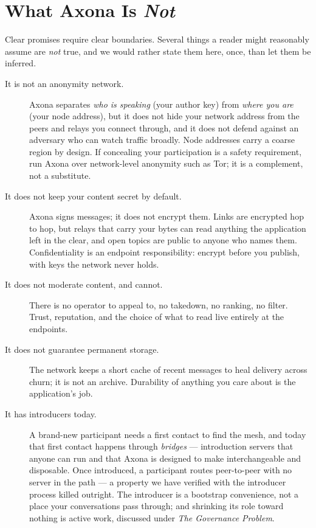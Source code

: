 \documentclass[nobib,justified]{tufte-handout}
\begin{document}
\section{What Axona Is \emph{Not}}

Clear promises require clear boundaries. Several things a reader might reasonably
assume are \emph{not} true, and we would rather state them here, once, than let
them be inferred.

\begin{description}
\item[It is not an anonymity network.] Axona separates \emph{who is speaking}
(your author key) from \emph{where you are} (your node address), but it does not
hide your network address from the peers and relays you connect through, and it
does not defend against an adversary who can watch traffic broadly. Node
addresses carry a coarse region by design. If concealing your participation is a
safety requirement, run Axona over network-level anonymity such as Tor; it is a
complement, not a substitute.

\item[It does not keep your content secret by default.] Axona signs messages; it
does not encrypt them. Links are encrypted hop to hop, but relays that carry your
bytes can read anything the application left in the clear, and open topics are
public to anyone who names them. Confidentiality is an endpoint responsibility:
encrypt before you publish, with keys the network never holds.

\item[It does not moderate content, and cannot.] There is no operator to appeal
to, no takedown, no ranking, no filter. Trust, reputation, and the choice of what
to read live entirely at the endpoints.

\item[It does not guarantee permanent storage.] The network keeps a short cache
of recent messages to heal delivery across churn; it is not an archive.
Durability of anything you care about is the application's job.

\item[It has introducers today.] A brand-new
participant needs a first contact to find the mesh, and today that first contact
happens through \emph{bridges} --- introduction servers that anyone can run and
that Axona is designed to make interchangeable and disposable. Once introduced, a
participant routes peer-to-peer with no server in the path --- a property we have
verified with the introducer process killed outright. The introducer is a
bootstrap convenience, not a place your conversations pass through; and shrinking
its role toward nothing is active work, discussed under \emph{The Governance
Problem}.
\end{description}
\end{document}
